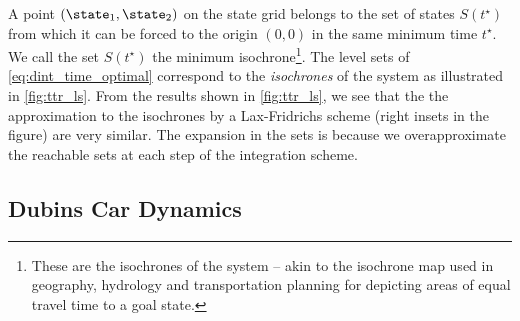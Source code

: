 A point $(\state_1, \state_2)$ on the state grid belongs to the set of states $S(t^\star)$ from which it can be forced to the origin $(0, 0)$ in the same minimum time $t^\star$. We call the set $S(t^\star)$ the minimum isochrone\footnote{These are the isochrones of the system -- akin to the isochrone map used in geography, hydrology and transportation planning for depicting areas of equal travel time to a goal state.}. The level sets of \eqref{eq:dint_time_optimal} correspond to the \textit{isochrones} of the system as illustrated in \autoref{fig:ttr_ls}. From the results shown in \autoref{fig:ttr_ls}, we see that the the approximation to the isochrones by a Lax-Fridrichs scheme (right insets in the figure) are very similar. The expansion in the sets is because we overapproximate the reachable sets at each step of the integration scheme.

\subsection{Dubins Car Dynamics}


